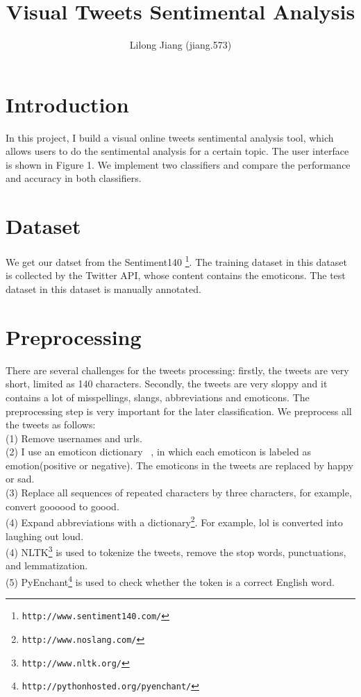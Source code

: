 \documentclass{article}
\begin{document}
\title{Visual Tweets Sentimental Analysis}
\author{Lilong Jiang (jiang.573)}
\maketitle

\section{Introduction}
In this project, I build a visual online tweets sentimental analysis tool, which allows users to do the sentimental analysis for a certain topic. The user interface is shown in Figure 1. We implement two classifiers and compare the performance and accuracy in both classifiers. 
\section{Dataset}
We get our datset from the Sentiment140 \footnote{\texttt{\scriptsize{http://www.sentiment140.com/‎}}}. The training dataset in this dataset is collected by the Twitter API, whose content contains the emoticons. The test dataset in this dataset is manually annotated.
\section{Preprocessing}
There are several challenges for the tweets processing: firstly, the tweets are very short, limited as 140 characters. Secondly, the tweets are very sloppy and it contains a lot of misspellings, slangs, abbreviations and emoticons. The preprocessing step is very important for the later classification.
We preprocess all the tweets as follows: \\
(1) Remove usernames and urls. \\
(2) I use an emoticon dictionary ~\cite{agarwal2011sentiment}, in which each emoticon is labeled as emotion(positive or negative). The emoticons in the tweets are replaced by happy or sad. \\
(3) Replace all sequences of repeated characters by three characters, for example, convert goooood to goood.\\
(4) Expand abbreviations with a dictionary\footnote{\texttt{\scriptsize{http://www.noslang.com/‎‎}}}. For example, lol is converted into laughing out loud. \\
(4) NLTK\footnote{\texttt{\scriptsize{http://www.nltk.org/‎‎}}} is used to tokenize the tweets, remove the stop words, punctuations, and lemmatization. \\
(5) PyEnchant\footnote{\texttt{\scriptsize{http://pythonhosted.org/pyenchant/‎‎}}} is used to check whether the token is a correct English word. \\ 
\end{document}
